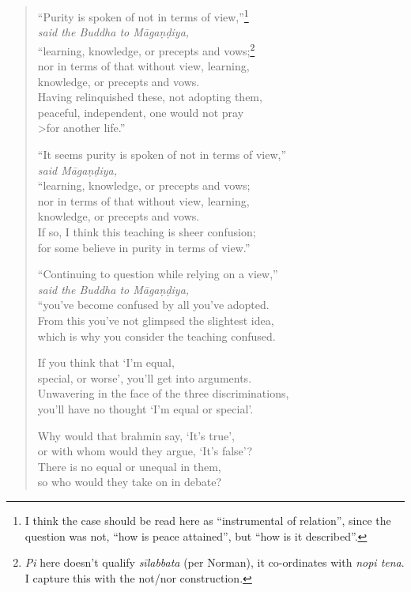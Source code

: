 \documentclass[12pt,openany]{book}%
\newcommand*{\scspeaker}[1]{\hspace{2em}\textit{#1}}
\begin{document}
\begin{verse}
“Purity is spoken of not in terms of view,”\footnote{I think the case should be read here as “instrumental of relation”, since the question was not, “how is peace attained”, but “how is it described”. } \\
\scspeaker{said the Buddha to \textsanskrit{Māgaṇḍiya}, }\\
“learning, knowledge, or precepts and vows;\footnote{\textit{Pi} here doesn’t qualify \textit{\textsanskrit{sīlabbata}} (per Norman), it co-ordinates with \textit{nopi tena}. I capture this with the not/nor construction. } \\
nor in terms of that without view, learning, \\
knowledge, or precepts and vows. \\
Having relinquished these, not adopting them, \\
peaceful, independent, one would not pray \\>for another life.” 

“It seems purity is spoken of not in terms of view,” \\
\scspeaker{said \textsanskrit{Māgaṇḍiya}, }\\
“learning, knowledge, or precepts and vows; \\
nor in terms of that without view, learning, \\
knowledge, or precepts and vows. \\
If so, I think this teaching is sheer confusion; \\
for some believe in purity in terms of view.” 

“Continuing to question while relying on a view,” \\
\scspeaker{said the Buddha to \textsanskrit{Māgaṇḍiya}, }\\
“you’ve become confused by all you’ve adopted. \\
From this you’ve not glimpsed the slightest idea, \\
which is why you consider the teaching confused. 

If you think that ‘I’m equal, \\
special, or worse’, you’ll get into arguments. \\
Unwavering in the face of the three discriminations, \\
you’ll have no thought ‘I’m equal or special’. 

Why would that brahmin say, ‘It’s true’, \\
or with whom would they argue, ‘It’s false’? \\
There is no equal or unequal in them, \\
so who would they take on in debate? 


\end{verse}
\end{document}
